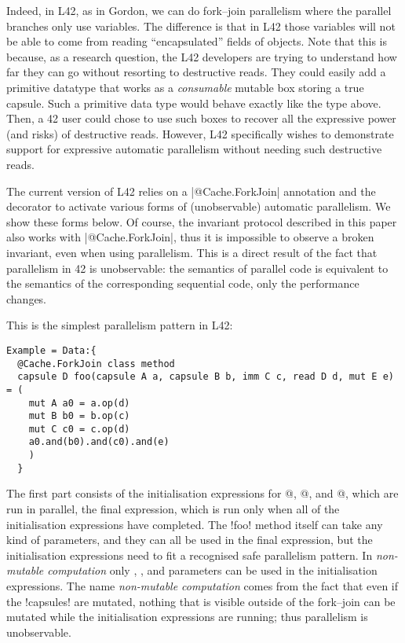 Indeed, in L42, as in Gordon, we can do fork--join parallelism where the parallel branches only use \Q@capsule@ variables.
The difference is that in L42 those variables will not be able to come from reading ``encapsulated'' fields of \Q@mut@ objects.
Note that this is because, as a research question, the L42 developers are trying to understand how far they can go without resorting to destructive reads.
They could easily add a primitive datatype that works as a \emph{consumable} mutable box storing a true capsule. Such a primitive data type would behave exactly like the \Q@Box@ type above.
Then, a 42 user could chose to use such boxes to recover all the expressive power (and risks) of destructive reads.
However, L42 specifically wishes to demonstrate support for expressive automatic parallelism without needing such destructive reads.

The current version of L42 relies on a \Q|@Cache.ForkJoin| annotation and the \Q@Data@ decorator to activate various forms of (unobservable) automatic parallelism. We show these forms below.
Of course, the invariant protocol described in this paper also works with \Q|@Cache.ForkJoin|, thus it is impossible to observe a broken invariant, even when using parallelism. This is a direct result of the fact that parallelism in 42 is unobservable: the semantics of parallel code is equivalent to the semantics of the corresponding sequential code, only the performance changes.


This is the simplest parallelism pattern in L42:
\begin{lstlisting}[deletekeywords=label]
Example = Data:{
  @Cache.ForkJoin class method 
  capsule D foo(capsule A a, capsule B b, imm C c, read D d, mut E e) = (
    mut A a0 = a.op(d)
    mut B b0 = b.op(c)
    mut C c0 = c.op(d)
    a0.and(b0).and(c0).and(e)
    )
  }
\end{lstlisting}
The first part consists of the initialisation expressions for @, @, and 
@, which are run in parallel, the final expression, which is run only when 
all of the initialisation expressions have completed.
The \Q!foo! method itself can take any kind of parameters, and they can all be used in the final expression, but the initialisation expressions need to fit a recognised
safe parallelism pattern. In \emph{non-mutable computation} only \Q@read@, \Q@capsule@, and \Q@imm@ parameters can be used in the initialisation expressions.
The name \emph{non-mutable computation} comes from the fact that even if the \Q!capsules! are mutated, nothing that is visible outside of the fork--join can be mutated while the initialisation expressions are running; thus parallelism is unobservable.

